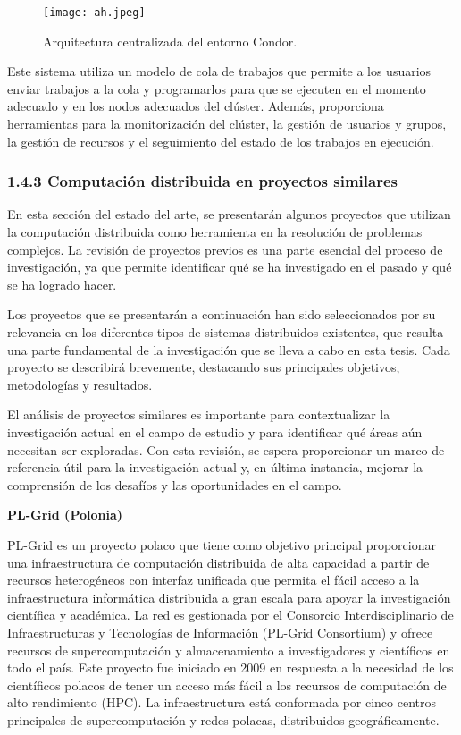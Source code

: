 \begin{spacing}{1.5}
  \begin{figure}[h]
    \centering
    \texttt{[image: ah.jpeg]}
    \caption{Arquitectura centralizada del entorno Condor. \cite{article1}}
    \label{fig:etiqueta}
  \end{figure}

  Este sistema utiliza un modelo de cola de trabajos que permite a los usuarios
  enviar trabajos a la cola y programarlos para que se ejecuten en el momento
  adecuado y en los nodos adecuados del clúster. Además, proporciona herramientas
  para la monitorización del clúster, la gestión de usuarios y grupos, la gestión
  de recursos y el seguimiento del estado de los trabajos en ejecución.
  \cite{DEF-HTCONDOR}

  \subsubsection{1.4.3 Computación distribuida en proyectos similares}

  En esta sección del estado del arte, se presentarán algunos proyectos que
  utilizan la computación distribuida como herramienta en la resolución de
  problemas complejos. La revisión de proyectos previos es una parte esencial del
  proceso de investigación, ya que permite identificar qué se ha investigado en
  el pasado y qué se ha logrado hacer.

  Los proyectos que se presentarán a continuación han sido seleccionados por su
  relevancia en los diferentes tipos de sistemas distribuidos existentes, que
  resulta una parte fundamental de la investigación que se lleva a cabo en esta
  tesis. Cada proyecto se describirá brevemente, destacando sus principales
  objetivos, metodologías y resultados.

  El análisis de proyectos similares es importante para contextualizar la
  investigación actual en el campo de estudio y para identificar qué áreas aún
  necesitan ser exploradas. Con esta revisión, se espera proporcionar un marco de
  referencia útil para la investigación actual y, en última instancia, mejorar la
  comprensión de los desafíos y las oportunidades en el campo.

  \textbf{PL-Grid (Polonia)}

  PL-Grid es un proyecto polaco que tiene como objetivo principal proporcionar
  una infraestructura de computación distribuida de alta capacidad a partir de
  recursos heterogéneos con interfaz unificada que permita el fácil acceso a la
  infraestructura informática distribuida a gran escala para apoyar la
  investigación científica y académica. La red es gestionada por el Consorcio
  Interdisciplinario de Infraestructuras y Tecnologías de Información (PL-Grid
  Consortium) y ofrece recursos de supercomputación y almacenamiento a
  investigadores y científicos en todo el país. Este proyecto fue iniciado en
  2009 en respuesta a la necesidad de los científicos polacos de tener un acceso
  más fácil a los recursos de computación de alto rendimiento (HPC). La
  infraestructura está conformada por cinco centros principales de
  supercomputación y redes polacas, distribuidos geográficamente.


\end{spacing}
